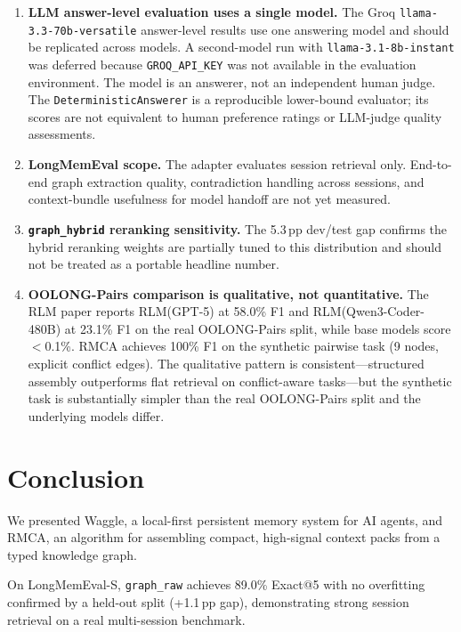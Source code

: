 \documentclass[conference]{IEEEtran}
\begin{document}
\begin{enumerate}
\item \textbf{LLM answer-level evaluation uses a single model.}
The Groq \texttt{llama-3.3-70b-versatile} answer-level results use one answering model and
should be replicated across models. A second-model run with \texttt{llama-3.1-8b-instant}
was deferred because \texttt{GROQ\_API\_KEY} was not available in the evaluation environment.
The model is an answerer, not an independent human judge. The
\texttt{DeterministicAnswerer} is a reproducible lower-bound evaluator; its scores are not
equivalent to human preference ratings or LLM-judge quality assessments.

\item \textbf{LongMemEval scope.} The adapter evaluates session retrieval only. End-to-end
graph extraction quality, contradiction handling across sessions, and context-bundle
usefulness for model handoff are not yet measured.

\item \textbf{\texttt{graph\_hybrid} reranking sensitivity.} The 5.3\,pp dev/test gap
confirms the hybrid reranking weights are partially tuned to this distribution and should
not be treated as a portable headline number.

\item \textbf{OOLONG-Pairs comparison is qualitative, not quantitative.}
The RLM paper reports RLM(GPT-5) at 58.0\% F1 and RLM(Qwen3-Coder-480B) at 23.1\% F1 on
the real OOLONG-Pairs split, while base models score $<$0.1\%. RMCA achieves 100\% F1 on
the synthetic pairwise task (9 nodes, explicit conflict edges). The qualitative pattern is
consistent---structured assembly outperforms flat retrieval on conflict-aware tasks---but
the synthetic task is substantially simpler than the real OOLONG-Pairs split and the
underlying models differ.
\end{enumerate}

\section{Conclusion}

We presented Waggle, a local-first persistent memory system for AI agents, and RMCA,
an algorithm for assembling compact, high-signal context packs from a typed knowledge graph.

On LongMemEval-S, \texttt{graph\_raw} achieves 89.0\% Exact@5 with no overfitting
confirmed by a held-out split (+1.1\,pp gap), demonstrating strong session retrieval
on a real multi-session benchmark.
\end{document}
